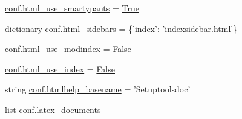 \begin{DoxyCompactItemize}
\item 
\hyperlink{namespaceconf_a0543ec4ed2f4f7a56f17b30c2e9e4916}{conf.\+html\+\_\+use\+\_\+smartypants} = \hyperlink{libqhull_8h_add3ca9eefe3b5b754426f51d3043e579}{True}
\item 
dictionary \hyperlink{namespaceconf_a851a997495677617858e78bff00d6c6e}{conf.\+html\+\_\+sidebars} = \{'index'\+: 'indexsidebar.\+html'\}
\item 
\hyperlink{namespaceconf_a8662adb4015249c70d8a12e9a5f258c8}{conf.\+html\+\_\+use\+\_\+modindex} = \hyperlink{libqhull_8h_a306ebd41c0cd1303b1372c6153f0caf8}{False}
\item 
\hyperlink{namespaceconf_af06bd0927581dbe55f99799545d18bd6}{conf.\+html\+\_\+use\+\_\+index} = \hyperlink{libqhull_8h_a306ebd41c0cd1303b1372c6153f0caf8}{False}
\item 
string \hyperlink{namespaceconf_a74d707b34bba474e9057f383ad01de83}{conf.\+htmlhelp\+\_\+basename} = 'Setuptoolsdoc'
\item 
list \hyperlink{namespaceconf_a00b7896473527f894006130b1113cb4b}{conf.\+latex\+\_\+documents}
\end{DoxyCompactItemize}
